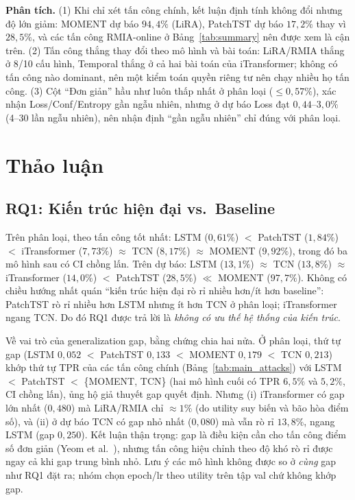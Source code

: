 \documentclass[12pt,a4paper]{report}
\begin{document}
\textbf{Phân tích.} (1) Khi chỉ xét tấn công chính, kết luận định tính không đổi nhưng độ lớn giảm: MOMENT dự báo $94{,}4\%$ (LiRA), PatchTST dự báo $17{,}2\%$ thay vì $28{,}5\%$, và các tấn công RMIA-online ở Bảng~\ref{tab:summary} nên được xem là cận trên. (2) Tấn công thắng thay đổi theo mô hình và bài toán: LiRA/RMIA thắng ở 8/10 cấu hình, Temporal thắng ở cả hai bài toán của iTransformer; không có tấn công nào dominant, nên một kiểm toán quyền riêng tư nên chạy nhiều họ tấn công. (3) Cột ``Đơn giản'' hầu như luôn thấp nhất ở phân loại ($\le 0{,}57\%$), xác nhận Loss/Conf/Entropy gần ngẫu nhiên, nhưng ở dự báo Loss đạt $0{,}44$--$3{,}0\%$ (4--30 lần ngẫu nhiên), nên nhận định ``gần ngẫu nhiên'' chỉ đúng với phân loại.

\chapter{Thảo luận}
\label{chap:thaoluan}

\section{RQ1: Kiến trúc hiện đại vs.\ Baseline}

Trên phân loại, theo tấn công tốt nhất: LSTM ($0{,}61\%$) $<$ PatchTST ($1{,}84\%$) $<$ iTransformer ($7{,}73\%$) $\approx$ TCN ($8{,}17\%$) $\approx$ MOMENT ($9{,}92\%$), trong đó ba mô hình sau có CI chồng lấn. Trên dự báo: LSTM ($13{,}1\%$) $\approx$ TCN ($13{,}8\%$) $\approx$ iTransformer ($14{,}0\%$) $<$ PatchTST ($28{,}5\%$) $\ll$ MOMENT ($97{,}7\%$). Không có chiều hướng nhất quán ``kiến trúc hiện đại rò rỉ nhiều hơn/ít hơn baseline'': PatchTST rò rỉ nhiều hơn LSTM nhưng ít hơn TCN ở phân loại; iTransformer ngang TCN. Do đó RQ1 được trả lời là \textit{không có ưu thế hệ thống của kiến trúc}.

Về vai trò của generalization gap, bằng chứng chia hai nửa. Ở phân loại, thứ tự gap (LSTM $0{,}052$ $<$ PatchTST $0{,}133$ $<$ MOMENT $0{,}179$ $<$ TCN $0{,}213$) khớp thứ tự TPR của các tấn công chính (Bảng~\ref{tab:main_attacks}) với LSTM $<$ PatchTST $<$ \{MOMENT, TCN\} (hai mô hình cuối có TPR $6{,}5\%$ và $5{,}2\%$, CI chồng lấn), ủng hộ giả thuyết gap quyết định. Nhưng (i) iTransformer có gap lớn nhất ($0{,}480$) mà LiRA/RMIA chỉ $\approx 1\%$ (do utility suy biến và bão hòa điểm số), và (ii) ở dự báo TCN có gap nhỏ nhất ($0{,}080$) mà vẫn rò rỉ $13{,}8\%$, ngang LSTM (gap $0{,}250$). Kết luận thận trọng: gap là điều kiện cần cho tấn công điểm số đơn giản (Yeom et al.\ \cite{yeom2018}), nhưng tấn công hiệu chỉnh theo độ khó rò rỉ được ngay cả khi gap trung bình nhỏ. Lưu ý các mô hình không được so ở \textit{cùng} gap như RQ1 đặt ra; nhóm chọn epoch/lr theo utility trên tập val chứ không khớp gap.
\end{document}
